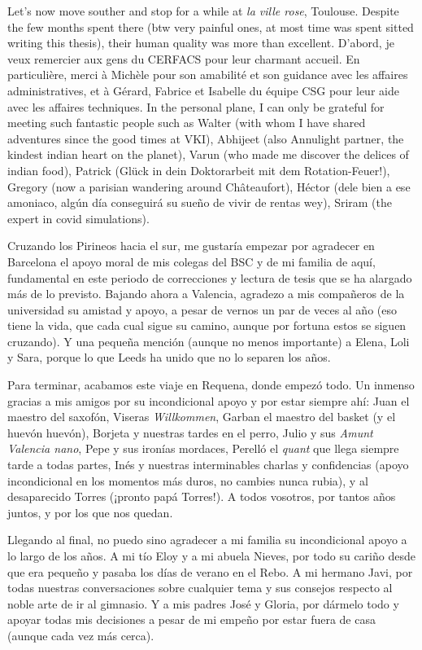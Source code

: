 Let's now move souther and stop for a while at \textsl{la ville rose}, Toulouse. Despite the few months spent there (btw very painful ones, at most time was spent sitted writing this thesis), their human quality was more than excellent. D'abord, je veux remercier aux gens du CERFACS pour leur charmant accueil. En particulière, merci à Michèle pour son amabilité et son guidance avec les affaires administratives, et à Gérard, Fabrice et Isabelle du équipe CSG pour leur aide avec les affaires techniques. In the personal plane, I can only be grateful for meeting such fantastic people such as Walter (with whom I have shared adventures since the good times at VKI), Abhijeet (also Annulight partner, the kindest indian heart on the planet), Varun (who made me discover the delices of indian food), Patrick (Glück in dein Doktorarbeit mit dem Rotation-Feuer!), Gregory (now a parisian wandering around Châteaufort), Héctor (dele bien a ese amoniaco, algún día conseguirá su sueño de vivir de rentas wey), Sriram (the expert in covid simulations).

Cruzando los Pirineos hacia el sur, me gustaría empezar por agradecer en Barcelona el apoyo moral de mis colegas del BSC y de mi familia de aquí, fundamental en este periodo de correcciones y lectura de tesis que se ha alargado más de lo previsto. Bajando ahora a Valencia, agradezo a mis compañeros de la universidad su amistad y apoyo, a pesar de vernos un par de veces al año (eso tiene la vida, que cada cual sigue su camino, aunque por fortuna estos se siguen cruzando). Y una pequeña mención (aunque no menos importante) a Elena, Loli y Sara, porque lo que Leeds ha unido que no lo separen los años. 

Para terminar, acabamos este viaje en Requena, donde empezó todo. Un inmenso gracias a mis amigos por su incondicional apoyo y por estar siempre ahí: Juan el maestro del saxofón, Viseras \textsl{Willkommen}, Garban el maestro del basket (y el huevón huevón), Borjeta y nuestras tardes en el perro, Julio y sus \textsl{Amunt Valencia nano}, Pepe y sus ironías mordaces, Perelló el \textsl{quant} que llega siempre tarde a todas partes, Inés y nuestras interminables charlas y confidencias (apoyo incondicional en los momentos más duros, no cambies nunca rubia), y al desaparecido Torres (¡pronto papá Torres!). A todos vosotros, por tantos años juntos, y por los que nos quedan.

Llegando al final, no puedo sino agradecer a mi familia su incondicional apoyo a lo largo de los años. A mi tío Eloy y a mi abuela Nieves, por todo su cariño desde que era pequeño y pasaba los días de verano en el Rebo. A mi hermano Javi, por todas nuestras conversaciones sobre cualquier tema y sus consejos respecto al noble arte de ir al gimnasio. Y a mis padres José y Gloria, por dármelo todo y apoyar todas mis decisiones a pesar de mi empeño por estar fuera de casa (aunque cada vez más cerca).

